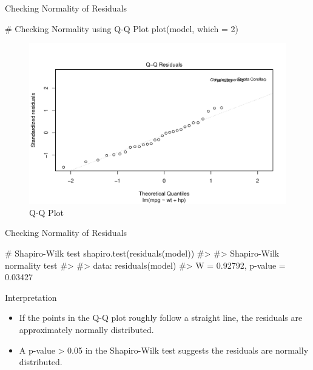 \documentclass[
  18 pt,
  ignorenonframetext,
  aspectratio=1610,
]{beamer}
\newenvironment{Shaded}{\begin{snugshade}}{\end{snugshade}}
\newcommand{\AttributeTok}[1]{\textcolor[rgb]{0.40,0.45,0.13}{#1}}
\newcommand{\CommentTok}[1]{\textcolor[rgb]{0.37,0.37,0.37}{#1}}
\newcommand{\DecValTok}[1]{\textcolor[rgb]{0.68,0.00,0.00}{#1}}
\newcommand{\FunctionTok}[1]{\textcolor[rgb]{0.28,0.35,0.67}{#1}}
\newcommand{\NormalTok}[1]{\textcolor[rgb]{0.00,0.23,0.31}{#1}}
\providecommand{\tightlist}{%
  \setlength{\itemsep}{0pt}\setlength{\parskip}{0pt}}\usepackage{longtable,booktabs,array}
\begin{document}
\begin{frame}[fragile]{Checking Normality of Residuals}
\protect\hypertarget{checking-normality-of-residuals-1}{}
\tiny

\begin{Shaded}
\begin{Highlighting}[]
\CommentTok{\# Checking Normality using Q{-}Q Plot}
\FunctionTok{plot}\NormalTok{(model, }\AttributeTok{which =} \DecValTok{2}\NormalTok{)}
\end{Highlighting}
\end{Shaded}

\begin{figure}

{\centering \includegraphics[width=\textwidth,height=0.5\textheight]{R-Regression_files/figure-beamer/unnamed-chunk-23-1.pdf}

}

\caption{Q-Q Plot}

\end{figure}
\end{frame}

\begin{frame}[fragile]{Checking Normality of Residuals}
\protect\hypertarget{checking-normality-of-residuals-2}{}
\begin{Shaded}
\begin{Highlighting}[]
\CommentTok{\# Shapiro{-}Wilk test}
\FunctionTok{shapiro.test}\NormalTok{(}\FunctionTok{residuals}\NormalTok{(model))}
\CommentTok{\#\textgreater{} }
\CommentTok{\#\textgreater{}  Shapiro{-}Wilk normality test}
\CommentTok{\#\textgreater{} }
\CommentTok{\#\textgreater{} data:  residuals(model)}
\CommentTok{\#\textgreater{} W = 0.92792, p{-}value = 0.03427}
\end{Highlighting}
\end{Shaded}

\begin{block}{Interpretation}
\protect\hypertarget{interpretation-6}{}
\begin{itemize}
\tightlist
\item
  If the points in the Q-Q plot roughly follow a straight line, the
  residuals are approximately normally distributed.
\item
  A p-value \textgreater{} 0.05 in the Shapiro-Wilk test suggests the
  residuals are normally distributed.
\end{itemize}
\end{block}
\end{frame}
\end{document}
